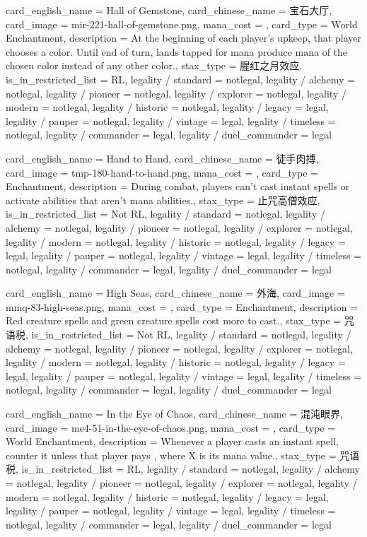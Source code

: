 \documentclass[lang = cn, color = black, 10pt]{AllThatStax}
\begin{document}
\card
{
	card_english_name = {Hall of Gemstone},
	card_chinese_name = {宝石大厅},
	card_image = mir-221-hall-of-gemstone.png,
	mana_cost = ,
	card_type = World Enchantment,
	description = {At the beginning of each player's upkeep, that player chooses a color. Until end of turn, lands tapped for mana produce mana of the chosen color instead of any other color.},
	stax_type = 腥红之月效应,
	is_in_restricted_list = RL,
	legality / standard = notlegal,
	legality / alchemy = notlegal,
	legality / pioneer = notlegal,
	legality / explorer = notlegal,
	legality / modern = notlegal,
	legality / historic = notlegal,
	legality / legacy = legal,
	legality / pauper = notlegal,
	legality / vintage = legal,
	legality / timeless = notlegal,
	legality / commander = legal,
	legality / duel_commander = legal
}

\card
{
	card_english_name = {Hand to Hand},
	card_chinese_name = {徒手肉搏},
	card_image = tmp-180-hand-to-hand.png,
	mana_cost = ,
	card_type = Enchantment,
	description = {During combat, players can't cast instant spells or activate abilities that aren't mana abilities.},
	stax_type = 止咒高僧效应,
	is_in_restricted_list = Not RL,
	legality / standard = notlegal,
	legality / alchemy = notlegal,
	legality / pioneer = notlegal,
	legality / explorer = notlegal,
	legality / modern = notlegal,
	legality / historic = notlegal,
	legality / legacy = legal,
	legality / pauper = notlegal,
	legality / vintage = legal,
	legality / timeless = notlegal,
	legality / commander = legal,
	legality / duel_commander = legal
}

\card
{
	card_english_name = {High Seas},
	card_chinese_name = {外海},
	card_image = mmq-83-high-seas.png,
	mana_cost = ,
	card_type = Enchantment,
	description = {Red creature spells and green creature spells cost  more to cast.},
	stax_type = 咒语税,
	is_in_restricted_list = Not RL,
	legality / standard = notlegal,
	legality / alchemy = notlegal,
	legality / pioneer = notlegal,
	legality / explorer = notlegal,
	legality / modern = notlegal,
	legality / historic = notlegal,
	legality / legacy = legal,
	legality / pauper = notlegal,
	legality / vintage = legal,
	legality / timeless = notlegal,
	legality / commander = legal,
	legality / duel_commander = legal
}

\card
{
	card_english_name = {In the Eye of Chaos},
	card_chinese_name = {混沌眼界},
	card_image = me4-51-in-the-eye-of-chaos.png,
	mana_cost = ,
	card_type = World Enchantment,
	description = {Whenever a player casts an instant spell, counter it unless that player pays , where X is its mana value.},
	stax_type = 咒语税,
	is_in_restricted_list = RL,
	legality / standard = notlegal,
	legality / alchemy = notlegal,
	legality / pioneer = notlegal,
	legality / explorer = notlegal,
	legality / modern = notlegal,
	legality / historic = notlegal,
	legality / legacy = legal,
	legality / pauper = notlegal,
	legality / vintage = legal,
	legality / timeless = notlegal,
	legality / commander = legal,
	legality / duel_commander = legal
}
\end{document}

